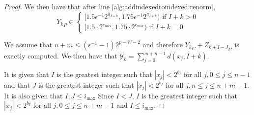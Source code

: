 \begin{proof}
      We then have that after line \ref{alg:addindexedtoindexed:renorm}, \[
          {Y_k}_P \in \begin{cases}[1.5  \epsilon^{-1} 2^{a_{I + k}}, 1.75  \epsilon^{-1} 2^{a_{I + k}}) \text{ if } I + k > 0 \\ [1.5 \cdot 2^{e_{\max}}, 1.75 \cdot 2^{e_{\max}}) \text{ if } I + k = 0\end{cases}
      \]

      We assume that $n + m \leq (\epsilon^{-1} - 1)2^{p - W - 2}$ and therefore ${Y_{k}}_C + {Z_{k + I-J}}_C$ is exactly computed. We then have that $\mathcal{Y}_k = \sum\limits_{j = 0}^{m + n - 1} d(x_j, I + k)$.

      It is given that $I$ is the greatest integer such that $|x_j| < 2^{b_I}$ for all $j, 0 \leq j \leq n - 1$ and that $J$ is the greatest integer such that $|x_j| < 2^{b_I}$ for all $j, n \leq j \leq n + m - 1$. It is also given that $I, J \leq i_{\max}$
      Since $I < J$, $I$ is the greatest integer such that $|x_j| < 2^{b_I}$ for all $j, 0 \leq j \leq n + m - 1$ and $I \leq i_{\max}$.
    \end{proof}
